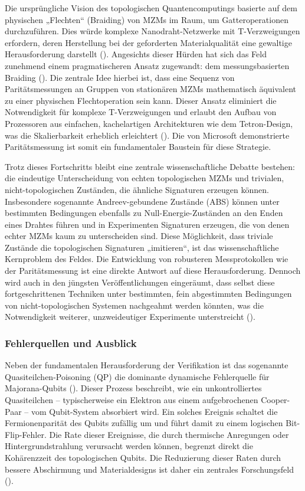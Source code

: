 Die ursprüngliche Vision des topologischen Quantencomputings basierte auf dem physischen „Flechten“ (Braiding) von MZMs im Raum, um Gatteroperationen durchzuführen. Dies würde komplexe Nanodraht-Netzwerke mit T-Verzweigungen erfordern, deren Herstellung bei der geforderten Materialqualität eine gewaltige Herausforderung darstellt (\cite{amorimMajoranaBraidingDynamics2015}). Angesichts dieser Hürden hat sich das Feld zunehmend einem pragmatischeren Ansatz zugewandt: dem messungsbasierten Braiding (\cite{amorimMajoranaBraidingDynamics2015}). Die zentrale Idee hierbei ist, dass eine Sequenz von Paritätsmessungen an Gruppen von stationären MZMs mathematisch äquivalent zu einer physischen Flechtoperation sein kann. Dieser Ansatz eliminiert die Notwendigkeit für komplexe T-Verzweigungen und erlaubt den Aufbau von Prozessoren aus einfachen, kachelartigen Architekturen wie dem Tetron-Design, was die Skalierbarkeit erheblich erleichtert (\cite{bolgarMicrosoftsMajorana1}). Die von Microsoft demonstrierte Paritätsmessung ist somit ein fundamentaler Baustein für diese Strategie.

Trotz dieses Fortschritts bleibt eine zentrale wissenschaftliche Debatte bestehen: die eindeutige Unterscheidung von echten topologischen MZMs und trivialen, nicht-topologischen Zuständen, die ähnliche Signaturen erzeugen können. Insbesondere sogenannte Andreev-gebundene Zustände (ABS) können unter bestimmten Bedingungen ebenfalls zu Null-Energie-Zuständen an den Enden eines Drahtes führen und in Experimenten Signaturen erzeugen, die von denen echter MZMs kaum zu unterscheiden sind. Diese Möglichkeit, dass triviale Zustände die topologischen Signaturen „imitieren“, ist das wissenschaftliche Kernproblem des Feldes. Die Entwicklung von robusteren Messprotokollen wie der Paritätsmessung ist eine direkte Antwort auf diese Herausforderung. Dennoch wird auch in den jüngsten Veröffentlichungen eingeräumt, dass selbst diese fortgeschrittenen Techniken unter bestimmten, fein abgestimmten Bedingungen von nicht-topologischen Systemen nachgeahmt werden könnten, was die Notwendigkeit weiterer, unzweideutiger Experimente unterstreicht (\cite{amorimMajoranaBraidingDynamics2015}).

\subsubsection{Fehlerquellen und Ausblick}

Neben der fundamentalen Herausforderung der Verifikation ist das sogenannte Quasiteilchen-Poisoning (QP) die dominante dynamische Fehlerquelle für Majorana-Qubits (\cite{svetogorovQuasiparticlePoisoningTrivial2021}). Dieser Prozess beschreibt, wie ein unkontrolliertes Quasiteilchen – typischerweise ein Elektron aus einem aufgebrochenen Cooper-Paar – vom Qubit-System absorbiert wird. Ein solches Ereignis schaltet die Fermionenparität des Qubits zufällig um und führt damit zu einem logischen Bit-Flip-Fehler. Die Rate dieser Ereignisse, die durch thermische Anregungen oder Hintergrundstrahlung verursacht werden können, begrenzt direkt die Kohärenzzeit des topologischen Qubits. Die Reduzierung dieser Raten durch bessere Abschirmung und Materialdesigns ist daher ein zentrales Forschungsfeld (\cite{svetogorovQuasiparticlePoisoningTrivial2021}).

